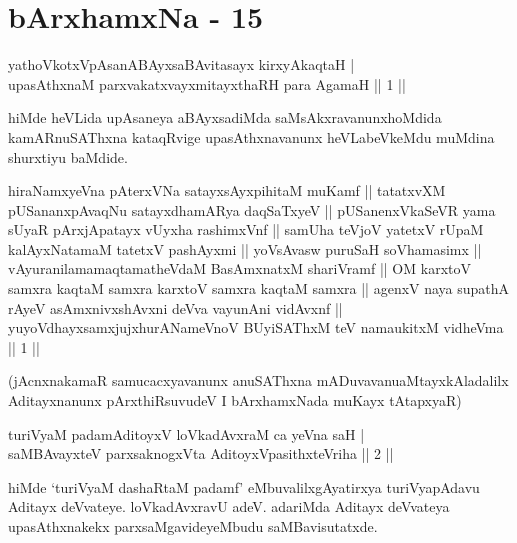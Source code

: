 \chapter{bArxhamxNa - 15}


\begin{shl}
yathoVkotxVpAsanABAyxsaBAvitasayx kirxyAkaqtaH | \\
upasAthxnaM parxvakatxvayxmitayxthaRH para AgamaH \hfill||  1 || 
\end{shl}

\begin{artha} 
hiMde heVLida upAsaneya aBAyxsadiMda saMsAkxravanunx\break hoMdida kamARnuSAThxna kataqRvige upasAthxnavanunx heVLabeVkeMdu muMdina 
shurxtiyu baMdide.\\
\begin{kandikeshl}
hiraNamxyeVna pAterxVNa satayxsAyxpihitaM muKamf || tatatxvXM pUSananxpAvaqNu satayxdhamARya daqSaTxyeV || pUSanenxVkaSeVR yama sUyaR pArxjApatayx vUyxha rashimxVnf || samUha teVjoV yatetxV rUpaM kalAyxNatamaM tatetxV pashAyxmi || yoV\s sAvasw puruSaH soV\s hamasimx || vAyuranilamamaqtamatheVdaM BasAmxnatxM shariVramf || OM karxtoV samxra kaqtaM samxra karxtoV samxra kaqtaM samxra || agenxV naya supathA rAyeV asAmxnivxshAvxni deVva vayunAni vidAvxnf || yuyoVdhayxsamxjujxhurANameVnoV BUyiSAThxM teV namaukitxM vidheVma || 1 ||
\end{kandikeshl}
(jAcnxnakamaR samucacxyavanunx anuSAThxna mADuvavanu\break aMtayxkAladalilx 
Aditayxnanunx pArxthiRsuvudeV I bArxhamxNada muKayx tAtapxyaR)
\end{artha}


\begin{shl}
turiVyaM padamAditoyxV loVkadAvxraM ca yeVna saH | \\
saMBAvayxteV parxsaknogxV\s ta AditoyxVpasithxteVriha \hfill||  2 || 
\end{shl}
\newpage
\begin{artha} 
hiMde `turiVyaM dashaRtaM padamf' eMbuvalilx\break gAyatirxya turiVyapAdavu 
Aditayx deVvateye. loVkadAvxravU adeV. adariMda Aditayx deVvateya 
upasAthxnakekx parxsaMgavideyeMbudu saMBavisutatxde.
\end{artha}

